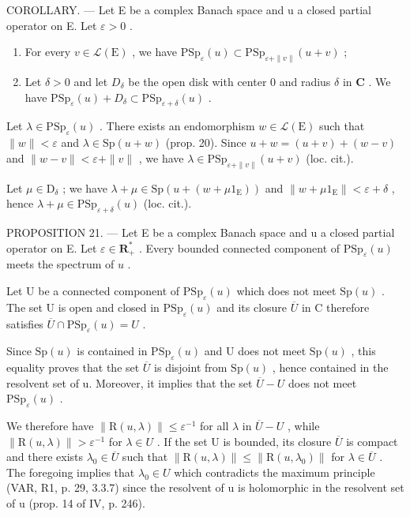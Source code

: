 COROLLARY. — Let E be a complex Banach space and u a closed partial operator on E. Let \(\varepsilon > 0\) .

\begin{enumerate}
\def\labelenumi{\alph{enumi})}
\item
  For every \(v \in \mathcal{L}(\mathrm{E})\) , we have \(\mathrm{PSp}_{\varepsilon}(u) \subset \mathrm{PSp}_{\varepsilon + \| v\|}(u + v)\) ;
\item
  Let \(\delta > 0\) and let \(D_{\delta}\) be the open disk with center 0 and radius \(\delta\) in \(\mathbf{C}\) . We have \(\mathrm{PSp}_{\varepsilon}(u) + D_{\delta} \subset \mathrm{PSp}_{\varepsilon + \delta}(u)\) .
\end{enumerate}

Let \(\lambda \in \mathrm{PSp}_{\varepsilon}(u)\) . There exists an endomorphism \(w \in \mathcal{L}(\mathrm{E})\) such that \(\|w\| < \varepsilon\) and \(\lambda \in \mathrm{Sp}(u+w)\) (prop. 20). Since \(u+w = (u+v)+(w-v)\) and \(\|w-v\| < \varepsilon + \|v\|\) , we have \(\lambda \in \mathrm{PSp}_{\varepsilon+ \|v\|}(u+v)\) (loc. cit.).

Let \(\mu \in \mathrm{D}_{\delta}\) ; we have \(\lambda + \mu \in \mathrm{Sp}(u + (w + \mu 1_{\mathrm{E}}))\) and \(\| w + \mu 1_{\mathrm{E}} \| < \varepsilon + \delta\) , hence \(\lambda + \mu \in \mathrm{PSp}_{\varepsilon + \delta}(u)\) (loc. cit.).

PROPOSITION 21. --- Let E be a complex Banach space and u a closed partial operator on E. Let \(\varepsilon\in\mathbf{R}_{+}^{*}\) . Every bounded connected component of \(\mathrm{PSp}_{\varepsilon}(u)\) meets the spectrum of \(u\) .

Let U be a connected component of \(\mathrm{PSp}_{\varepsilon}(u)\) which does not meet \(\mathrm{Sp}(u)\) . The set U is open and closed in \(\mathrm{PSp}_{\varepsilon}(u)\) and its closure \(\overline{U}\) in C therefore satisfies \(\overline{U} \cap \mathrm{PSp}_{\varepsilon}(u) = U\) .

Since \(\mathrm{Sp}(u)\) is contained in \(\mathrm{PSp}_{\varepsilon}(u)\) and U does not meet \(\mathrm{Sp}(u)\) , this equality proves that the set \(\overline{U}\) is disjoint from \(\mathrm{Sp}(u)\) , hence contained in the resolvent set of u. Moreover, it implies that the set \(\overline{U}-U\) does not meet \(\mathrm{PSp}_{\varepsilon}(u)\) .

We therefore have \(\|\mathrm{R}(u,\lambda)\| \leqslant \varepsilon^{-1}\) for all \(\lambda\) in \(\overline{U} - U\) , while \(\|\mathrm{R}(u,\lambda)\| > \varepsilon^{-1}\) for \(\lambda \in U\) . If the set U is bounded, its closure \(\overline{U}\) is compact and there exists \(\lambda_{0} \in \overline{U}\) such that \(\|\mathrm{R}(u,\lambda)\| \leqslant \|\mathrm{R}(u,\lambda_{0})\|\) for \(\lambda \in \overline{U}\) . The foregoing implies that \(\lambda_{0} \in U\) which contradicts the maximum principle (VAR, R1, p. 29, 3.3.7) since the resolvent of u is holomorphic in the resolvent set of u (prop. 14 of IV, p. 246).

